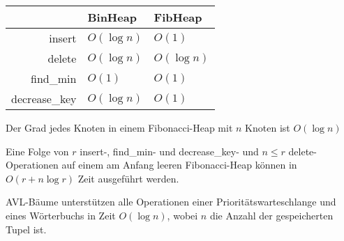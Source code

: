 \documentclass{cheat-sheet}
\begin{document}







\begin{center}
  \begin{tabular}{r | l l}
    & BinHeap & FibHeap \\ \hline
    insert & $O(\log n)$ & $O(1)$ \\
    delete & $O(\log n)$ & $O(\log n)$ \\
    find_min & $O(1)$ & $O(1)$ \\
    decrease_key & $O(\log n)$ & $O(1)$ \\
  \end{tabular}
\end{center}


\begin{satz}
  Der Grad jedes Knoten in einem Fibonacci-Heap mit $n$ Knoten ist $O(\log n)$
\end{satz}

\begin{satz}
  Eine Folge von $r$ insert-, find_min- und decrease_key- und $n \leq r$ delete-Operationen auf einem am Anfang leeren Fibonacci-Heap können in $O(r + n \log r)$ Zeit ausgeführt werden.
\end{satz}




\begin{satz}
  AVL-Bäume unterstützen alle Operationen einer Prioritätswarteschlange und eines Wörterbuchs in Zeit $O(\log n)$, wobei $n$ die Anzahl der gespeicherten Tupel ist.
\end{satz}
\end{document}
